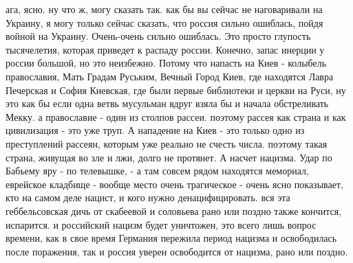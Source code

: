 ага, ясно. ну что ж, могу сказать так. как бы вы сейчас не наговаривали на
Украину, я могу только сейчас сказать, что россия сильно ошиблась, пойдя войной
на Украину. Очень-очень сильно ошиблась. Это просто глупость тысячелетия,
которая приведет к распаду россии. Конечно, запас инерции у россии большой, но
это неизбежно. Потому что напасть на Киев - колыбель православия, Мать Градам
Руським, Вечный Город Киев, где находятся Лавра Печерская и София Киевская, где
были первые библиотеки и церкви на Руси, ну это как бы если одна ветвь
мусульман вдруг взяла бы и начала обстреливать Мекку. а православие - один из
столпов рассеи. поэтому рассея как страна и как цивилизация - это уже труп. А
нападение на Киев - это только одно из преступлений рассеян, которым уже
реально не счесть числа. поэтому такая страна, живущая во зле и лжи, долго не
протянет. А насчет нацизма. Удар по Бабьему яру - по телевышке, - а там совсем
рядом находятся мемориал, еврейское кладбище - вообще место очень трагическое -
очень ясно показывает, кто на самом деле нацист, и кого нужно денацифицировать.
вся эта геббельсовская дичь от скабеевой и соловьева рано или поздно также
кончится, испарится. и российский нацизм будет уничтожен, это всего лишь вопрос
времени, как в свое время Германия пережила период нацизма и освободилась после
поражения, так и россия уверен освободится от нацизма, рано или поздно.

